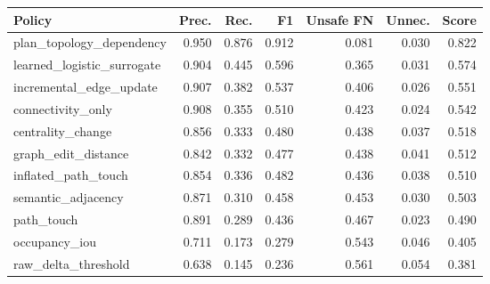 \begin{tabular}{lrrrrrr}
\toprule
Policy & Prec. & Rec. & F1 & Unsafe FN & Unnec. & Score \\
\midrule
plan\_topology\_dependency & 0.950 & 0.876 & 0.912 & 0.081 & 0.030 & 0.822 \\
learned\_logistic\_surrogate & 0.904 & 0.445 & 0.596 & 0.365 & 0.031 & 0.574 \\
incremental\_edge\_update & 0.907 & 0.382 & 0.537 & 0.406 & 0.026 & 0.551 \\
connectivity\_only & 0.908 & 0.355 & 0.510 & 0.423 & 0.024 & 0.542 \\
centrality\_change & 0.856 & 0.333 & 0.480 & 0.438 & 0.037 & 0.518 \\
graph\_edit\_distance & 0.842 & 0.332 & 0.477 & 0.438 & 0.041 & 0.512 \\
inflated\_path\_touch & 0.854 & 0.336 & 0.482 & 0.436 & 0.038 & 0.510 \\
semantic\_adjacency & 0.871 & 0.310 & 0.458 & 0.453 & 0.030 & 0.503 \\
path\_touch & 0.891 & 0.289 & 0.436 & 0.467 & 0.023 & 0.490 \\
occupancy\_iou & 0.711 & 0.173 & 0.279 & 0.543 & 0.046 & 0.405 \\
raw\_delta\_threshold & 0.638 & 0.145 & 0.236 & 0.561 & 0.054 & 0.381 \\
\bottomrule
\end{tabular}

